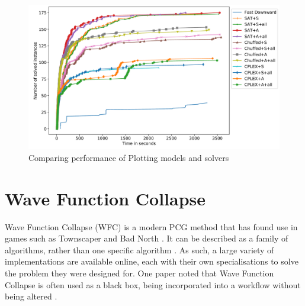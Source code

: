 \begin{figure}[H]
        \centering
        \includegraphics[width=\textwidth, height=0.3\textheight, keepaspectratio]{Images/PlottingSolverComparison.png}
        \caption{Comparing performance of Plotting models and solvers  \cite{Plotting_Planning_Problem}}
        \label{fig:plottingSolverComparison}
\end{figure}


\section{Wave Function Collapse}
Wave Function Collapse (WFC) \cite{Gumin_Wave_Function_Collapse_2016} is a modern PCG method that has found use in games such as Townscaper \cite{townscaper} and Bad North \cite{badnorth}. It can be described as a family of algorithms, rather than one specific algorithm \cite{WFC_ConstraintSolving_and_ML}. As such, a large variety of implementations are available online, each with their own specialisations to solve the problem they were designed for. One paper noted that Wave Function Collapse is often used as a black box, being incorporated into a workflow without being altered \cite{WFC_In_The_Wild}.

